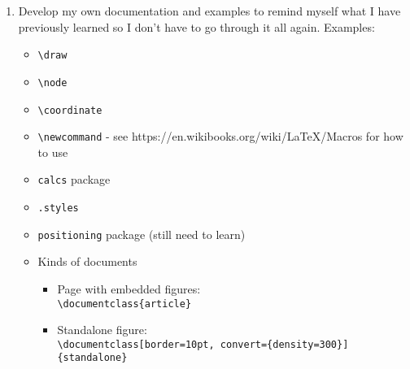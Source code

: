 \documentclass{article}
\begin{document}
\begin{enumerate}
    \item Develop my own documentation and examples to remind myself what I have previously learned so I don't have to go through it all again. Examples:
	\begin{itemize}
		\item \verb!\draw!
		\item \verb!\node!
		\item \verb!\coordinate!
		\item \verb!\newcommand! - see https://en.wikibooks.org/wiki/LaTeX/Macros for how to use
		\item \verb!calcs! package
		\item \verb!.styles!
		\item \verb!positioning! package (still need to learn)
		\item Kinds of documents 
		\begin{itemize}
			\item Page with embedded figures: \\ \verb!\documentclass{article}!
			\item Standalone figure: \\ \verb!\documentclass[border=10pt, convert={density=300}]{standalone}!
		\end{itemize}
	\end{itemize}
    
\end{enumerate}
\end{document}
